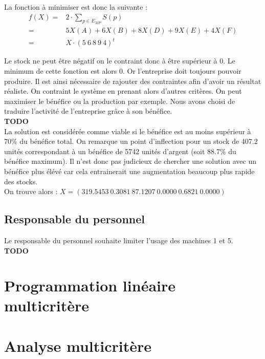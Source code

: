 \documentclass[a4paper, 11pt]{article}
\begin{document}
La fonction à minimiser est donc la suivante : \\
$$
\begin{array}{rl}
    f(X) = & 2\cdot \sum_{p\in E_{MP}} S(p) \\
         = & 5 X(A) + 6 X(B) + 8 X(D) + 9 X(E) + 4 X(F) \\
         = & X\cdot(5~6~8~9~4)^t
\end{array}
$$

Le stock ne peut être négatif on le contraint donc à être supérieur à 0. Le
minimum de cette fonction est alors 0. Or l'entreprise doit toujours pouvoir
produire. Il est ainsi nécessaire de rajouter des contraintes afin d'avoir un
résultat réaliste. On contraint le système en prenant alors d'autres
critères. On peut maximiser le bénéfice ou la production par exemple. Nous
avons choisi de traduire l’activité de l’entreprise grâce à son bénéfice. \\

\textbf{TODO} \\

La solution est considérée comme viable si le bénéfice est au moins supérieur à
70\% du bénéfice total. On remarque un point d’inflection pour un stock de
407.2 unités correspondant à un bénéfice de 5742 unités d’argent (soit 88.7\% du
bénéfice maximum). Il n’est donc pas judicieux de chercher une solution avec
un bénéfice plus élévé car cela entrainerait une augmentation beaucoup plus
rapide des stocks. \\

On trouve alors : $ X = (319.5453 ~0.3081 ~87.1207 ~0.0000 ~0.6821 ~0.0000) $

\subsection{Responsable du personnel}
Le responsable du personnel souhaite limiter l'usage des machines 1 et 5.
\\ \textbf{TODO} \\

\section{Programmation linéaire multicritère}

\section{Analyse multicritère}
\end{document}
